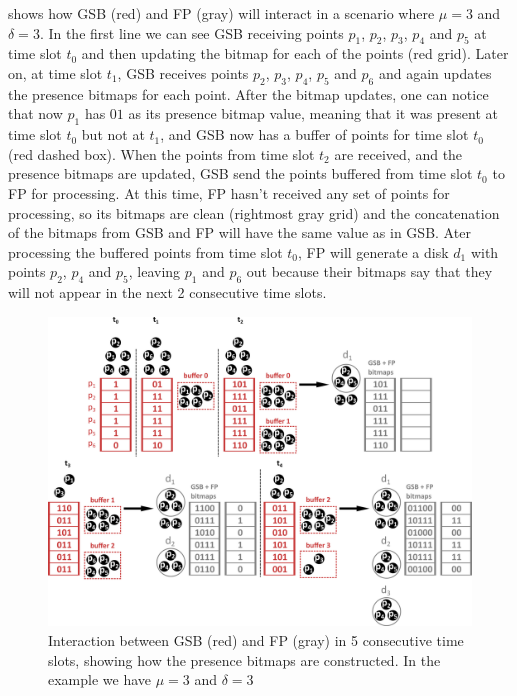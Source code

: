  shows how GSB (red) and FP (gray) will interact in a scenario where $\mu = 3$ and $\delta = 3$.
In the first line we can see GSB receiving points $p_1$, $p_2$, $p_3$, $p_4$ and $p_5$ at time slot $t_0$ and then
updating the bitmap for each of the points (red grid). Later on, at time slot $t_1$, GSB receives points $p_2$, $p_3$,
$p_4$, $p_5$ and $p_6$ and again updates the presence bitmaps for each point. After the bitmap updates, one can notice
that now $p_1$ has $01$ as its presence bitmap value, meaning that it was present at time slot $t_0$ but not at $t_1$,
and GSB now has a buffer of points for time slot $t_0$ (red dashed box). When the points from time slot $t_2$ are
received, and the presence bitmaps are updated, GSB send the points buffered from time slot $t_0$ to FP for processing.
At this time, FP hasn't received any set of points for processing, so its bitmaps are clean (rightmost gray grid) and
the concatenation of the bitmaps from GSB and FP will have the same value as in GSB. Ater processing the buffered points
from time slot $t_0$, FP will generate a disk $d_1$ with points $p_2$, $p_4$ and $p_5$, leaving $p_1$ and $p_6$ out
because their bitmaps say that they will not appear in the next 2 consecutive time slots.

\begin{figure}[h!]
    \centering
    \includegraphics[width=\linewidth]{images/gsb_fp_flow.png}
    \caption{Interaction between GSB (red) and FP (gray) in 5 consecutive time slots, showing how the presence bitmaps
        are constructed. In the example we have $\mu = 3$ and $\delta = 3$}
    \label{fig:gsb_fp_flow}
\end{figure}


